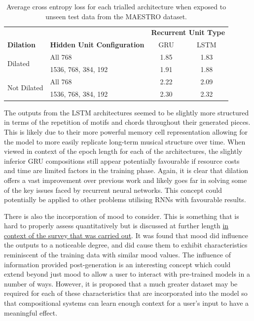 \documentclass[12pt,]{article}
\begin{document}
\begin{table}[H]
\centering
\caption{Average cross entropy loss for each trialled architecture when exposed to unseen test data from the MAESTRO dataset.}
\vspace{1em}
\begin{tabular}{llcc} 
\toprule
                             &                                    & \multicolumn{2}{c}{\textbf{Recurrent Unit Type}}  \\
\textbf{Dilation}            & \textbf{Hidden Unit Configuration} & GRU   & LSTM                                      \\ 
\hline
\multirow{2}{*}{Dilated}     & All 768                            & 1.85  & 1.83                                      \\ 
                             & 1536, 768, 384, 192                & 1.91  & 1.88                                     \\ 
\multirow{2}{*}{Not Dilated} & All 768                            & 2.22  & 2.09                                     \\ 
                             & 1536, 768, 384, 192                & 2.30  & 2.32                                     \\
\bottomrule
\end{tabular}
\end{table}

The outputs from the LSTM architectures seemed to be slightly more
structured in terms of the repetition of motifs and chords throughout
their generated pieces. This is likely due to their more powerful memory
cell representation allowing for the model to more easily replicate
long-term musical structure over time. When viewed in context of the
epoch length for each of the architectures, the slightly inferior GRU
compositions still appear potentially favourable if resource costs and
time are limited factors in the training phase. Again, it is clear that
dilation offers a vast improvement over previous work and likely goes
far in solving some of the key issues faced by recurrent neural
networks. This concept could potentially be applied to other problems
utilising RNNs with favourable results.

There is also the incorporation of mood to consider. This is something
that is hard to properly assess quantitatively but is discussed at
further length \protect\hyperlink{qualitativesurveyingassessment}{in
context of the survey that was carried out}. It was found that mood did
influence the outputs to a noticeable degree, and did cause them to
exhibit characteristics reminiscent of the training data with similar
mood values. The influence of information provided post-generation is an
interesting concept which could extend beyond just mood to allow a user
to interact with pre-trained models in a number of ways. However, it is
proposed that a much greater dataset may be required for each of these
characteristics that are incorporated into the model so that
compositional systems can learn enough context for a user's input to
have a meaningful effect.
\end{document}
